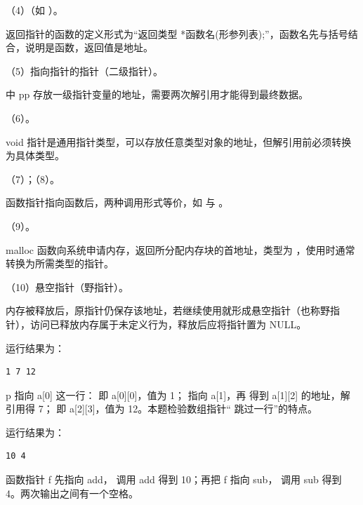 \documentclass[a4paper,11pt]{article}
\begin{document}
\q （4）（如 ）。\begin{analysis}返回指针的函数的定义形式为“返回类型 *函数名(形参列表);”，函数名先与括号结合，说明是函数，返回值是地址。\end{analysis}

\q （5）指向指针的指针（二级指针）。\begin{analysis} 中 pp 存放一级指针变量的地址，需要两次解引用才能得到最终数据。\end{analysis}

\q （6）。\begin{analysis}void 指针是通用指针类型，可以存放任意类型对象的地址，但解引用前必须转换为具体类型。\end{analysis}

\q （7）；（8）。\begin{analysis}函数指针指向函数后，两种调用形式等价，如  与 。\end{analysis}

\q （9）。\begin{analysis}malloc 函数向系统申请内存，返回所分配内存块的首地址，类型为 ，使用时通常转换为所需类型的指针。\end{analysis}

\q （10）悬空指针（野指针）。\begin{analysis}内存被释放后，原指针仍保存该地址，若继续使用就形成悬空指针（也称野指针），访问已释放内存属于未定义行为，释放后应将指针置为 NULL。\end{analysis}


\q 运行结果为：
\begin{lstlisting}
1 7 12
\end{lstlisting}
\begin{analysis}p 指向 a[0] 这一行： 即 a[0][0]，值为 1； 指向 a[1]，再  得到 a[1][2] 的地址，解引用得 7； 即 a[2][3]，值为 12。本题检验数组指针“ 跳过一行”的特点。\end{analysis}

\q 运行结果为：
\begin{lstlisting}
10 4
\end{lstlisting}
\begin{analysis}函数指针 f 先指向 add， 调用 add 得到 10；再把 f 指向 sub， 调用 sub 得到 4。两次输出之间有一个空格。\end{analysis}
\end{document}
